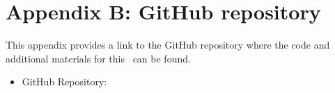 

\chapter*{Appendix B: GitHub repository}
\setcounter{chapter}{1}
\label{app:gitrepo}

This appendix provides a link to the GitHub repository where the code and additional materials for this \documenttype\ can be found.

\begin{itemize}
    \item GitHub Repository: \gitrepo
\end{itemize}


